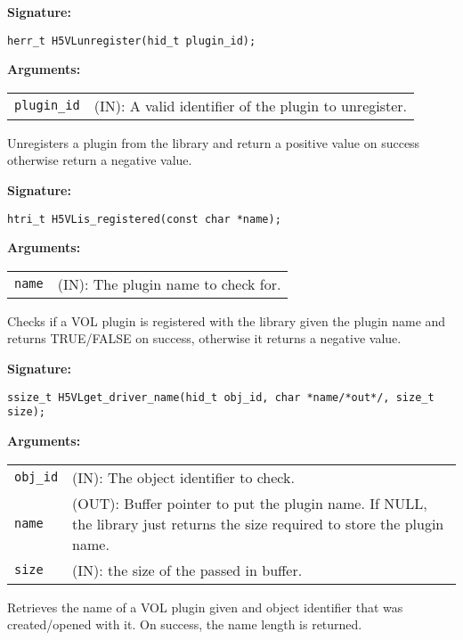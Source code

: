 \begin{mdframed}[style=bgbox]
\textbf{Signature:}
\begin{lstlisting}
herr_t H5VLunregister(hid_t plugin_id);
\end{lstlisting}
\textbf{Arguments:}\\
\begin{tabular}{l p{13.5cm}}
  {\tt plugin\_id} & (IN): A valid identifier of the plugin to unregister.\\
\end{tabular}
\end{mdframed}
Unregisters a plugin from the library and return a positive value on success otherwise return a negative value.\bigskip


\begin{mdframed}[style=bgbox]
\textbf{Signature:}
\begin{lstlisting}
htri_t H5VLis_registered(const char *name);
\end{lstlisting}
\textbf{Arguments:}\\
\begin{tabular}{l p{13.5cm}}
  {\tt name} & (IN): The plugin name to check for.\\
\end{tabular}
\end{mdframed}
Checks if a VOL plugin is registered with the library given the plugin name and returns TRUE/FALSE on success, otherwise it returns a negative value.\bigskip


\begin{mdframed}[style=bgbox]
\textbf{Signature:}
\begin{lstlisting}
ssize_t H5VLget_driver_name(hid_t obj_id, char *name/*out*/, size_t size);
\end{lstlisting}

\textbf{Arguments:}\\
\begin{tabular}{l p{13.5cm}}
  {\tt obj\_id} & (IN): The object identifier to check.\\
  {\tt name} & (OUT): Buffer pointer to put the plugin name. If NULL, the library just returns the size required to store the plugin name.\\
  {\tt size} & (IN): the size of the passed in buffer.\\
\end{tabular}
\end{mdframed}
Retrieves the name of a VOL plugin given and object identifier that was created/opened with it. On success, the name length is returned.\bigskip


